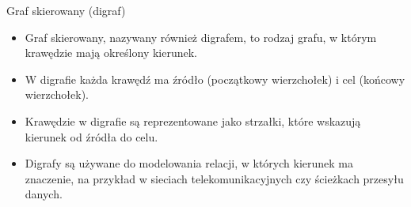 \documentclass[polish,envcountsect,10pt]{beamer}
\begin{document}
\begin{frame}{Graf skierowany (digraf)}
    \begin{itemize}
    \item Graf skierowany, nazywany również digrafem, to rodzaj grafu, w którym krawędzie mają określony kierunek.
    \item W digrafie każda krawędź ma źródło (początkowy wierzchołek) i cel (końcowy wierzchołek).
    \item Krawędzie w digrafie są reprezentowane jako strzałki, które wskazują kierunek od źródła do celu.
    \item Digrafy są używane do modelowania relacji, w których kierunek ma znaczenie, na przykład w sieciach telekomunikacyjnych czy ścieżkach przesyłu danych.
    \end{itemize}

    \begin{center}
    \end{center}
\end{frame}
\end{document}
